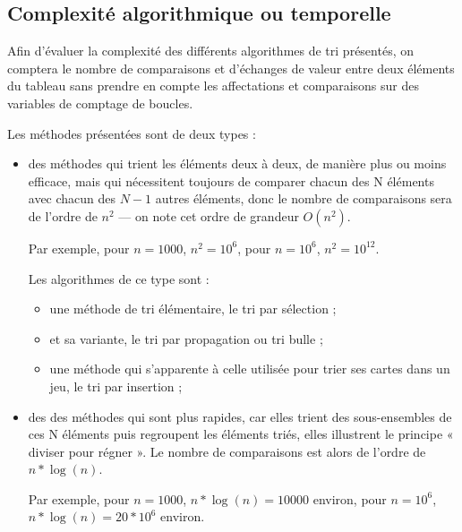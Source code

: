 \documentclass[11pt,a4paper]{article}
\begin{document}
\newpage
\subsection{Complexité algorithmique ou temporelle}
Afin d’évaluer la complexité des différents algorithmes de tri présentés, on comptera le nombre de comparaisons et d’échanges de valeur entre deux
éléments du tableau sans prendre en compte les affectations et comparaisons sur des variables de comptage de boucles.\\
\vspace{0.1cm}

Les méthodes présentées sont de deux types :
\begin{itemize}
    \item des méthodes qui trient les éléments deux à deux, de manière plus ou moins
          efficace, mais qui nécessitent toujours de comparer chacun des N éléments avec
          chacun des $N-1$ autres éléments, donc le nombre de comparaisons sera de l’ordre
          de $n^2$ — on note cet ordre de grandeur $\displaystyle{O(n^2)}$.
          \vspace{0.1cm}

          Par exemple, pour $n=1000$, $n^2=10^6$, pour $n=10^6$, $n^2=10^{12}$.
          \vspace{0.2cm}

          Les algorithmes de ce type sont :
          \begin{itemize}
              \item une méthode de tri élémentaire, le tri par sélection ;
              \item et sa variante, le tri par propagation ou tri bulle ;
              \item une méthode qui s’apparente à celle utilisée pour trier ses cartes dans un jeu, le tri par insertion ;
          \end{itemize}
          \vspace{0.2cm}

    \item des des méthodes qui sont plus rapides, car elles trient des sous-ensembles de ces N éléments puis regroupent les
          éléments triés, elles illustrent le principe « diviser pour régner ». Le nombre de comparaisons est alors de l’ordre de
          $n*\log(n)$.
          \vspace{0.1cm}

          Par exemple, pour $n=1000$, $n*\log(n)=10000$ environ, pour ${n=10^6}$, $n*\log(n)=20*10^6$ environ.
          \vspace{0.2cm}


\end{itemize}
\end{document}
